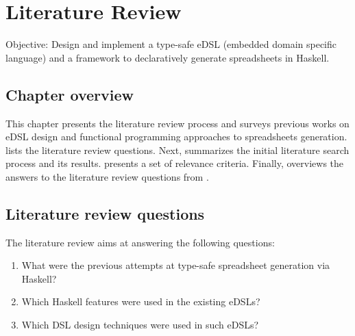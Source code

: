 \chapter{Literature Review}
\label{chap:lr}

Objective: Design and implement a type-safe eDSL (embedded domain specific language) and a framework to declaratively generate spreadsheets in Haskell.

\section{Chapter overview}
This chapter presents the literature review process and surveys previous works on eDSL design and functional programming approaches to spreadsheets generation.  lists the literature review questions. Next,  summarizes the initial literature search process and its results.  presents a set of relevance criteria. Finally,  overviews the answers to the literature review questions from .

\section{Literature review questions} \label {sec:research_questions}
The literature review aims at answering the following questions:
\begin{enumerate}[noitemsep]
    \item What were the previous attempts at type-safe spreadsheet generation via Haskell?
    \item Which Haskell features were used in the existing eDSLs?
    \item Which DSL design techniques were used in such eDSLs?
\end{enumerate}

